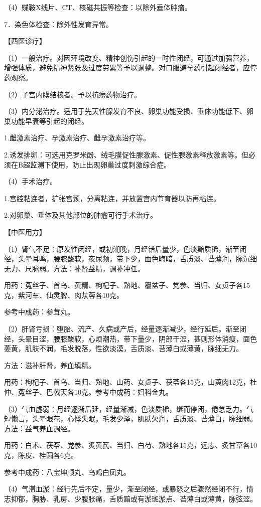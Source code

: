 \documentclass[12pt,UTF8,openany]{ctexbook}
\begin{document}
（4）蝶鞍X线片、CT、核磁共振等检查：以除外垂体肿瘤。

7．染色体检查：除外性发育异常。

【西医诊疗】

（1）一般治疗。对因环境改变、精神创伤引起的一时性闭经，可通过加强营养，增强体质，避免精神紧张及过度劳累等予以调整。对口服避孕药引起闭经者，应停药观察。

（2）子宫内膜结核者。予以抗痨药物治疗。

（3）内分泌治疗。适用于先天性腺发育不良、卵巢功能受损、垂体功能低下、卵巢功能早衰等引起的闭经。

1.雌激素治疗、孕激素治疗、雌孕激素治疗等。

2.诱发排卵：可选用克罗米酚、绒毛膜促性腺激素、促性腺激素释放激素等。但必须在B超监测下使用，防止出现卵巢过度刺激综合症。

（4）手术治疗。

1.宫腔粘连者，扩张宫颈，分离粘连，并放置宫内节育器以防再粘连。

2.对卵巢、垂体及其他部位的肿瘤可行手术治疗。

【中医用方】

（1）肾气不足：原发性闭经，或初潮晚，月经错后量少，色淡黯质稀，渐至闭经，头晕耳鸣，腰膝酸软，夜尿频，带下少，面色晦暗，舌质淡、苔薄润，脉沉细无力、尺脉弱。方法：补肾益精，调补冲任。

用药：菟丝子、首乌、黄精、枸杞子、熟地、覆盆子、党参、当归、女贞子各15克，紫河车、仙灵脾、肉苁蓉各10克。

参考中成药：参茸丸。

（2）肝肾亏损：堕胎、流产、久病或产后，经量逐渐减少，经行延后。渐至闭经，头晕目涩，腰膝酸软，心烦潮热，带下量少，阴部干涩，甚则形体消瘦，面色萎黄，肌肤不润，毛发脱落，性欲淡漠，舌质淡、苔薄白或薄黄，脉细无力。

方法：滋补肝肾，养血填精。

用药：枸杞子、首乌、当归、熟地、山药、女贞子、茯苓各15克，山萸肉12克，杜仲、菟丝子、巴戟天各10克。参考中成药：妇科金丸。

（3）气血虚弱：月经逐渐后延，经量渐减，色淡质稀，继而停闭，倦怠乏力。气短懒言，头晕眼花，心悸失眠，毛发少泽，肌肤欠润，舌质淡、苔薄白，脉细弱。方法：益气养血调经。

用药：白术、茯苓、党参、炙黄芪、当归、白芍、熟地各15克，远志、炙甘草各10克，陈皮、桂圆各6克。

参考中成药：八宝坤顺丸、乌鸡白凤丸。

（4）气滞血淤：经行先后不定，量少，渐至闭经，或暴怒之后骤然经闭不行，情志抑郁，胸胁、乳房、少腹胀痛，舌质黯或有淤斑淤点、苔薄白或薄黄，脉弦涩。
\end{document}
